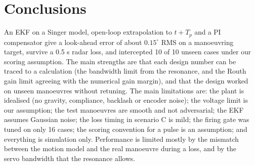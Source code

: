 \documentclass[conference]{IEEEtran}
\newcommand{\dg}{^\circ}
\begin{document}
\section{Conclusions}
An EKF on a Singer model, open-loop extrapolation to $t+T_p$ and a PI compensator give a look-ahead error of about $0.15\dg$ RMS on a manoeuvring target, survive a 0.5 s radar loss, and intercepted 10 of 10 unseen cases under our scoring assumption. The main strengths are that each design number can be traced to a calculation (the bandwidth limit from the resonance, and the Routh gain limit agreeing with the numerical gain margin), and that the design worked on unseen manoeuvres without retuning. The main limitations are: the plant is idealised (no gravity, compliance, backlash or encoder noise); the voltage limit is our assumption; the test manoeuvres are smooth and not adversarial; the EKF assumes Gaussian noise; the loss timing in scenario C is mild; the firing gate was tuned on only 16 cases; the scoring convention for a pulse is an assumption; and everything is simulation only. Performance is limited mostly by the mismatch between the motion model and the real manoeuvre during a loss, and by the servo bandwidth that the resonance allows.




\clearpage
{}

\end{document}

